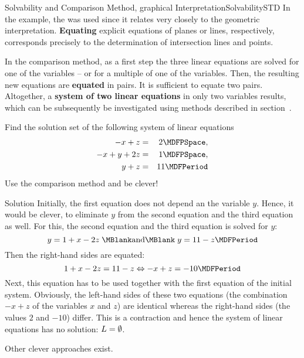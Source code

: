 \begin{MXContent}{Solvability and Comparison Method, graphical Interpretation}{Solvability}{STD}
In the example, the 
was used since it relates very closely to the geometric interpretation. \textbf{Equating}
explicit equations of planes or lines, respectively, corresponds precisely to the determination
of intersection lines and points.
 
\begin{MInfo}
In the comparison method, as a first step the three linear equations are solved for 
one of the variables -- or for a multiple of one of the variables. Then, the resulting 
new equations are \textbf{equated} in pairs. It is sufficient to equate two pairs.  
Altogether, a \textbf{system of two linear equations} in only two variables results,
which can be subsequently be investigated using methods described in 
section~.
\end{MInfo}

\begin{MExercise}
Find the solution set of the following system of linear equations
\begin{eqnarray*}
- x + z & = & 2 \MDFPSpace, \\ - x + y + 2 z & = & 1 \MDFPSpace, \\ y + z & = & 11 \MDFPeriod
\end{eqnarray*}
Use the comparison method and be clever!

\begin{MHint}{Solution}
Initially, the first equation does not depend an the variable $y$. Hence, it would
be clever, to eliminate $y$ from the second equation and the third equation as well. 
For this, the second equation and the third equation is solved for $y$:
$$y = 1 + x - 2 z \; \MBlank\mbox{and}\MBlank \; y = 11 - z \MDFPeriod $$
Then the right-hand sides are equated:
$$1 + x - 2 z = 11 - z \Leftrightarrow - x + z = - 10 \MDFPeriod $$
Next, this equation has to be used together with the first equation of the initial system. 
Obviously, the left-hand sides of these two equations (the combination $- x + z$ of 
the variables $x$ and $z$) are identical whereas the right-hand sides 
(the values $2$ and $-10$) differ. This is a contraction and hence the system
of linear equations has no solution: ${L} = \emptyset$.

Other clever approaches exist.
\end{MHint}
\end{MExercise}
\end{MXContent}

